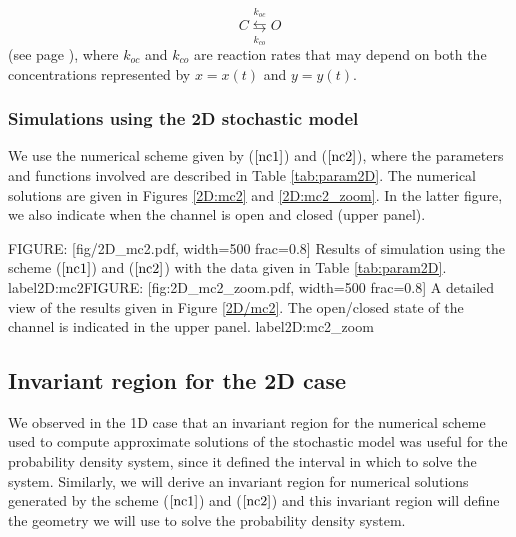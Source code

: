 \begin{equation}
C\underset{k_{co}}{\overset{k_{oc}}{\leftrightarrows}}O \label{Markov2}
\end{equation}
(see page \pageref{numscheme}),
where $k_{oc}$ and $k_{co}$ are reaction rates that may depend on both the concentrations
represented by $x=x(t)$ and $y=y(t)$.

\subsubsection{Simulations using the 2D stochastic model}


We use the numerical scheme given by ($\ref{nc1}$) and ($\ref{nc2}$), where the parameters and functions involved are described in Table \ref{tab:param2D}. The numerical solutions are given in Figures \ref{2D:mc2} and \ref{2D:mc2_zoom}. In the latter figure, we also indicate when the channel is open and closed (upper panel).

FIGURE: [fig/2D_mc2.pdf, width=500 frac=0.8] Results of simulation using the scheme ($\ref{nc1}$) and ($\ref{nc2}$) with the data given in Table \ref{tab:param2D}. label{2D:mc2}FIGURE: [fig:2D_mc2_zoom.pdf, width=500 frac=0.8] A detailed view of the results given in Figure \ref{2D/mc2}. The open/closed state of the channel is indicated in the upper panel. label{2D:mc2_zoom}%


\subsection{Invariant region for the 2D case}
\label{invariant2D}

We observed in the 1D case that an invariant region for the numerical scheme used to compute approximate solutions of the stochastic model was useful for the probability density system, since it defined the interval in which to solve the system. Similarly, we will derive an invariant region for numerical solutions generated by the scheme  ($\ref{nc1}$) and ($\ref{nc2}$) and this invariant region will define the geometry we will use to solve the probability density system.

